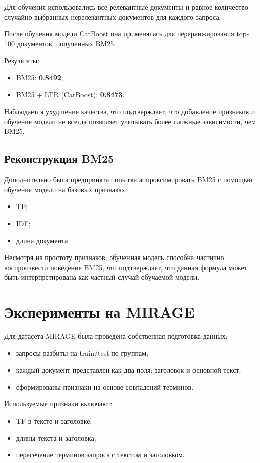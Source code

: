 \documentclass[11pt]{article}
\begin{document}
Для обучения использовались все релевантные документы и равное количество случайно
выбранных нерелевантных документов для каждого запроса.

После обучения модели CatBoost она применялась для переранжирования top-100
документов, полученных BM25.

Результаты:
\begin{itemize}
    \item BM25: \textbf{0.8492};
    \item BM25 + LTR (CatBoost): \textbf{0.8473}.
\end{itemize}

Наблюдается ухудшение качества, что подтверждает, что добавление признаков и
обучение модели не всегда позволяет учитывать более сложные зависимости, чем BM25.

\subsection{Реконструкция BM25}

Дополнительно была предпринята попытка аппроксимировать BM25 с помощью обучения
модели на базовых признаках:
\begin{itemize}
    \item TF;
    \item IDF;
    \item длина документа.
\end{itemize}

Несмотря на простоту признаков, обученная модель способна частично воспроизвести
поведение BM25, что подтверждает, что данная формула может быть интерпретирована
как частный случай обучаемой модели.

\section{Эксперименты на MIRAGE}

Для датасета MIRAGE была проведена собственная подготовка данных:
\begin{itemize}
    \item запросы разбиты на train/test по группам;
    \item каждый документ представлен как два поля: заголовок и основной текст;
    \item сформированы признаки на основе совпадений терминов.
\end{itemize}

Используемые признаки включают:
\begin{itemize}
    \item TF в тексте и заголовке;
    \item длины текста и заголовка;
    \item пересечение терминов запроса с текстом и заголовком.
\end{itemize}
\end{document}

